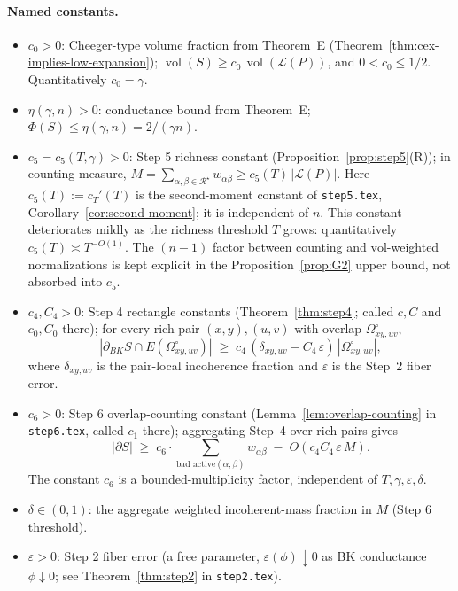 \paragraph{Named constants.}
\begin{itemize}[nosep]
 \item $c_0 > 0$: Cheeger-type volume fraction from Theorem~E
 (Theorem~\ref{thm:cex-implies-low-expansion}); $\operatorname{vol}(S)
 \ge c_0\,\operatorname{vol}(\mathcal L(P))$, and $0 < c_0 \le 1/2$.
 Quantitatively $c_0 = \gamma$.
 \item $\eta(\gamma, n) > 0$: conductance bound from Theorem~E;
 $\Phi(S) \le \eta(\gamma, n) = 2/(\gamma n)$.
 \item $c_5 = c_5(T,\gamma) > 0$: Step 5 richness constant
 (Proposition~\ref{prop:step5}(R)); in counting measure,
 $M = \sum_{\alpha,\beta \in \mathcal R^\star} w_{\alpha\beta}
 \ge c_5(T)\,|\mathcal L(P)|$. Here $c_5(T) := c_T'(T)$ is the
 second-moment constant of \texttt{step5.tex},
 Corollary~\ref{cor:second-moment}; it is independent of $n$. This
 constant deteriorates mildly as the richness threshold $T$ grows:
 quantitatively $c_5(T) \asymp T^{-O(1)}$. The $(n-1)$ factor between
 counting and $\mathrm{vol}$-weighted normalizations is kept explicit
 in the Proposition~\ref{prop:G2} upper bound, not absorbed into
 $c_5$.
 \item $c_4, C_4 > 0$: Step 4 rectangle constants
 (Theorem~\ref{thm:step4}; called $c, C$ and $c_0, C_0$ there); for
 every rich pair $(x,y), (u,v)$ with overlap $\Omega^\circ_{xy,uv}$,
 \[
  |\partial_{BK} S \cap E(\Omega^\circ_{xy,uv})|
  \;\ge\; c_4\,(\delta_{xy,uv} - C_4\,\varepsilon)\,
  |\Omega^\circ_{xy,uv}|,
 \]
 where $\delta_{xy,uv}$ is the pair-local incoherence fraction and
 $\varepsilon$ is the Step~2 fiber error.
 \item $c_6 > 0$: Step 6 overlap-counting constant
 (Lemma~\ref{lem:overlap-counting} in \texttt{step6.tex}, called
 $c_1$ there); aggregating Step~4 over rich pairs gives
 \[
  |\partial S| \;\ge\; c_6 \cdot \sum_{\text{bad active}(\alpha,\beta)}
  w_{\alpha\beta} \;-\; O(c_4 C_4\,\varepsilon\, M).
 \]
 The constant $c_6$ is a bounded-multiplicity factor, independent of
 $T, \gamma, \varepsilon, \delta$.
 \item $\delta \in (0,1)$: the aggregate weighted incoherent-mass
 fraction in $M$ (Step 6 threshold).
 \item $\varepsilon > 0$: Step 2 fiber error (a free parameter,
 $\varepsilon(\phi) \downarrow 0$ as BK conductance $\phi \downarrow 0$;
 see Theorem~\ref{thm:step2} in \texttt{step2.tex}).
\end{itemize}


